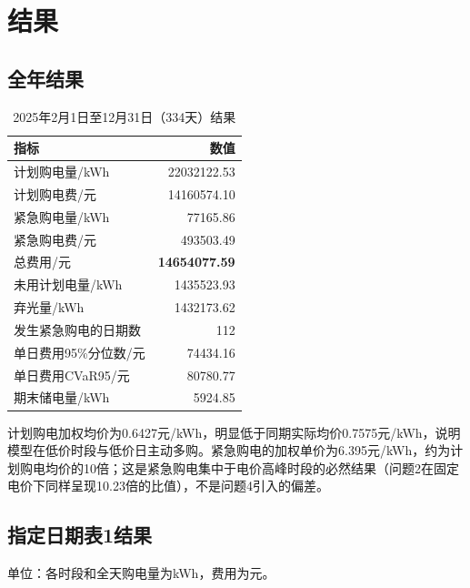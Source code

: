 \documentclass[UTF8,12pt]{ctexart}
\begin{document}
\section{结果}
\subsection{全年结果}
\begin{table}[H]\centering
\caption{2025年2月1日至12月31日（334天）结果}
\begin{tabular}{lr}\toprule
指标 & 数值\\\midrule
计划购电量/kWh & 22032122.53\\
计划购电费/元 & 14160574.10\\
紧急购电量/kWh & 77165.86\\
紧急购电费/元 & 493503.49\\
总费用/元 & \textbf{14654077.59}\\
未用计划电量/kWh & 1435523.93\\
弃光量/kWh & 1432173.62\\
发生紧急购电的日期数 & 112\\
单日费用95\%分位数/元 & 74434.16\\
单日费用CVaR95/元 & 80780.77\\
期末储电量/kWh & 5924.85\\\bottomrule
\end{tabular}
\end{table}

计划购电加权均价为0.6427元/kWh，明显低于同期实际均价0.7575元/kWh，说明模型在低价时段与低价日主动多购。紧急购电的加权单价为6.395元/kWh，约为计划购电均价的10倍；这是紧急购电集中于电价高峰时段的必然结果（问题2在固定电价下同样呈现10.23倍的比值），不是问题4引入的偏差。

\subsection{指定日期表1结果}
单位：各时段和全天购电量为kWh，费用为元。
\begin{table}[H]\centering\small
\caption{表1格式的计划购电结果}
\end{table}
\end{document}
